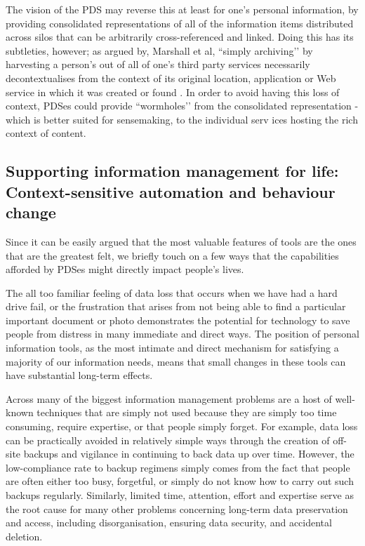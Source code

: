\documentclass[graybox]{svmult}
\begin{document}
The vision of the PDS may reverse this at least for one’s personal information, by providing consolidated representations of all of the information items distributed across silos that can be arbitrarily cross-referenced and linked.  Doing this has its subtleties, however;  as argued by, Marshall et al, ``simply archiving’’ by  harvesting a person’s out of all of one’s third party services necessarily decontextualises from the context of its original location, application or Web service in which it was created or found \cite{marshall2011challenges}.  In order to avoid having this loss of context, PDSes could provide ``wormholes’’ from the consolidated representation - which is better suited for sensemaking, to the individual serv ices hosting the rich context of content.

\subsection{Supporting information management for life: Context-sensitive automation and behaviour change}
Since it can be easily argued that the most valuable features of tools are the ones that are the greatest felt, we briefly touch on a few ways that the capabilities afforded by PDSes  might directly impact people’s lives.  

The all too familiar feeling of data loss that occurs when we have had a hard drive fail, or the frustration that arises from not being able to find a particular important document or photo demonstrates the potential for technology to save people from distress in many immediate and direct ways.  The position of personal information tools, as the most intimate and direct mechanism for satisfying a majority of our information needs, means that small changes in these tools can have substantial long-term effects.

Across many of the biggest information management problems are a host of well-known techniques that are simply not used because they are simply too time consuming, require expertise, or that people simply forget.  For example, data loss can be practically avoided in relatively simple ways through the creation of off-site backups and vigilance in continuing to back data up over time. However, the low-compliance rate to backup regimens simply comes from the fact that people are often either too busy, forgetful, or simply do not know how to carry out such backups regularly.  Similarly, limited time, attention, effort and expertise serve as the root cause for many other problems concerning long-term data preservation and access, including disorganisation, ensuring data security, and accidental deletion.
\end{document}
